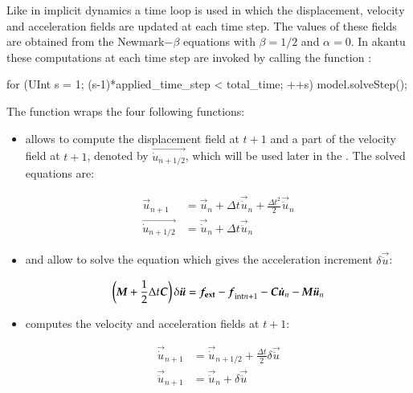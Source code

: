 Like in implicit dynamics a time loop is used in which the
displacement, velocity and acceleration fields are updated at each
time step. The values of these fields are obtained from the
Newmark$-\beta$ equations with $\beta=1/2$ and $\alpha=0$. In akantu
these computations at each time step are invoked by calling the
function :
\begin{cpp} 
for (UInt s = 1; (s-1)*applied_time_step < total_time; ++s) { 
  model.solveStep(); 
}
\end{cpp}  
The function
 wraps the four following functions:
\begin{itemize}
\item {} allows to compute the displacement
  field at $t+1$ and a part of the velocity field at $t+1$, denoted by
  $\vec{\dot{u}_{n+1/2}}$, which will be used later in the
  . The solved equations are:

  \begin{align} 
    \vec{u}_{n+1} &= \vec{u}_{n} + \Delta t
    \vec{\dot{u}}_{n} + \frac{\Delta t^2}{2} \vec{\ddot{u}}_{n}\\
    \vec{\dot{u}_{n+1/2}} &= \vec{\dot{u}}_{n} + \Delta t
    \vec{\ddot{u}}_{n}
    \label{eqn:smm:explicit:onehalfvelocity}
  \end{align}

\item {} and
   allow to solve the equation which
  gives the acceleration increment $\delta \vec{\ddot{u}}$:

  \begin{equation} 
    \left(\boldsymbol{M} + \frac{1}{2} \Delta t \boldsymbol{C}\right)
    \delta \boldsymbol{\ddot{u}} = \boldsymbol{f_{{\mathrm{ext}}}} - \boldsymbol{f}_{{\mathrm{int}}n+1}
    - \boldsymbol{C} \boldsymbol{\dot{u}}_{n} - \boldsymbol{M} \boldsymbol{\ddot{u}}_{n}
  \end{equation}


\item {} computes the velocity and
  acceleration fields at $t+1$:

  \begin{align} 
    \vec{\dot{u}}_{n+1} &= \vec{\dot{u}}_{n+1/2} + \frac{\Delta t}{2}
    \delta \vec{\ddot{u}} \\ \vec{\ddot{u}}_{n+1} &=
    \vec{\ddot{u}}_{n} + \delta \vec{\ddot{u}}
  \end{align}
\end{itemize}


